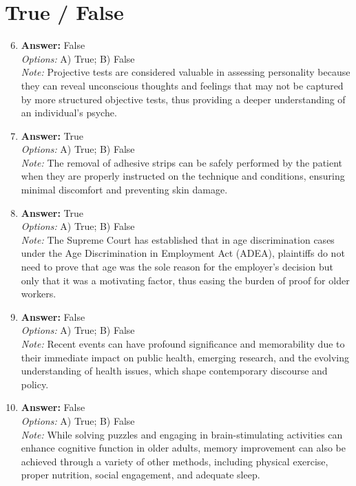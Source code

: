 \documentclass[12pt]{article}
\begin{document}
\section*{True / False}
\begin{enumerate}[label=\arabic*.]
\setcounter{enumi}{5}
\item \textbf{Answer:} False
\\ \textit{Options:} A) True; B) False
\\ \textit{Note:} Projective tests are considered valuable in assessing personality because they can reveal unconscious thoughts and feelings that may not be captured by more structured objective tests, thus providing a deeper understanding of an individual's psyche.
\item \textbf{Answer:} True
\\ \textit{Options:} A) True; B) False
\\ \textit{Note:} The removal of adhesive strips can be safely performed by the patient when they are properly instructed on the technique and conditions, ensuring minimal discomfort and preventing skin damage.
\item \textbf{Answer:} True
\\ \textit{Options:} A) True; B) False
\\ \textit{Note:} The Supreme Court has established that in age discrimination cases under the Age Discrimination in Employment Act (ADEA), plaintiffs do not need to prove that age was the sole reason for the employer's decision but only that it was a motivating factor, thus easing the burden of proof for older workers.
\item \textbf{Answer:} False
\\ \textit{Options:} A) True; B) False
\\ \textit{Note:} Recent events can have profound significance and memorability due to their immediate impact on public health, emerging research, and the evolving understanding of health issues, which shape contemporary discourse and policy.
\item \textbf{Answer:} False
\\ \textit{Options:} A) True; B) False
\\ \textit{Note:} While solving puzzles and engaging in brain-stimulating activities can enhance cognitive function in older adults, memory improvement can also be achieved through a variety of other methods, including physical exercise, proper nutrition, social engagement, and adequate sleep.
\end{enumerate}
\end{document}
